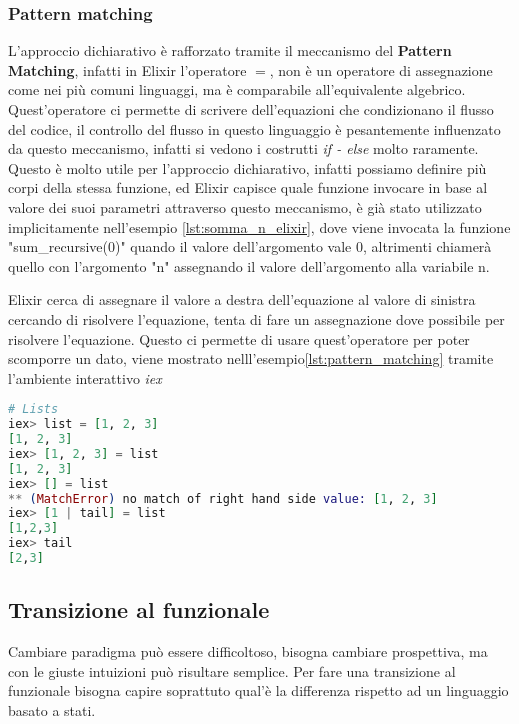 \subsubsection{Pattern matching}

L'approccio dichiarativo è rafforzato tramite il meccanismo
del \textbf{Pattern Matching}, infatti in Elixir l'operatore $=$,
non è un operatore di assegnazione come nei più comuni linguaggi,
ma è comparabile all'equivalente algebrico.
Quest'operatore ci permette di scrivere dell'equazioni
che condizionano il flusso del codice, il controllo del flusso
in questo linguaggio è pesantemente influenzato da questo meccanismo,
infatti si vedono i costrutti \textit{if - else} molto raramente.
Questo è molto utile per l'approccio
dichiarativo, infatti possiamo definire più corpi della stessa funzione,
ed Elixir capisce quale funzione invocare in base
al valore dei suoi parametri attraverso questo meccanismo,
è già stato utilizzato implicitamente nell'esempio \ref{lst:somma_n_elixir},
dove viene invocata la funzione "sum\_recursive(0)" quando
il valore dell'argomento vale 0, altrimenti chiamerà quello
con l'argomento "n" assegnando il valore dell'argomento alla variabile n.

Elixir cerca di assegnare il valore a destra dell'equazione
al valore di sinistra cercando di risolvere l'equazione, tenta
di fare un assegnazione dove possibile per risolvere l'equazione.
Questo ci permette di usare quest'operatore per poter
scomporre un dato, viene mostrato nelll'esempio\ref{lst:pattern_matching}
tramite l'ambiente interattivo \textit{iex}

\begin{lstlisting}[language=elixir, caption={Pattern Matching},captionpos=b,
	label={lst:pattern_matching}]
# Lists
iex> list = [1, 2, 3]
[1, 2, 3]
iex> [1, 2, 3] = list
[1, 2, 3]
iex> [] = list
** (MatchError) no match of right hand side value: [1, 2, 3]
iex> [1 | tail] = list
[1,2,3]
iex> tail
[2,3]
\end{lstlisting}


\subsection{Transizione al funzionale}

Cambiare paradigma può essere difficoltoso, bisogna
cambiare prospettiva, ma con le giuste intuizioni
può risultare semplice. Per fare una transizione al funzionale
bisogna capire soprattuto qual'è la differenza rispetto ad un
linguaggio basato a stati.

